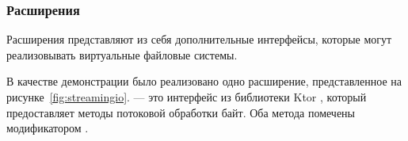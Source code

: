%
%
%


  \subsubsection{Расширения}
    Расширения представляют из себя дополнительные интерфейсы, которые могут реализовывать виртуальные файловые системы.

    В качестве демонстрации было реализовано одно расширение, представленное на рисунке~\ref{fig:streamingio}.  --- это интерфейс из библиотеки Ktor , который предоставляет методы потоковой обработки байт. Оба метода помечены модификатором .
    
